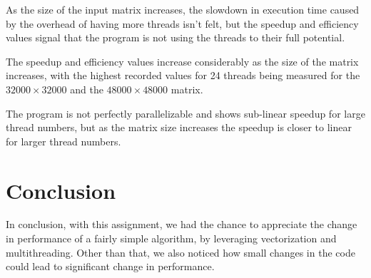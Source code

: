 \documentclass{article}
\begin{document}
As the size of the input matrix increases, the slowdown in execution time caused by the overhead of having more threads isn't felt, but the speedup and efficiency values signal that the program is not using the threads to their full potential.

The speedup and efficiency values increase considerably as the size of the matrix increases, with the highest recorded values for 24 threads being measured for the $32000\times32000$ and the $48000\times48000$ matrix.

The program is not perfectly parallelizable and shows sub-linear speedup for large thread numbers, but as the matrix size increases the speedup is closer to linear for larger thread numbers.

\section{Conclusion}

In conclusion, with this assignment, we had the chance to appreciate the change in performance of a fairly simple algorithm, by leveraging vectorization and multithreading. Other than that, we also noticed how small changes in the code could lead to significant change in performance.
\end{document}
